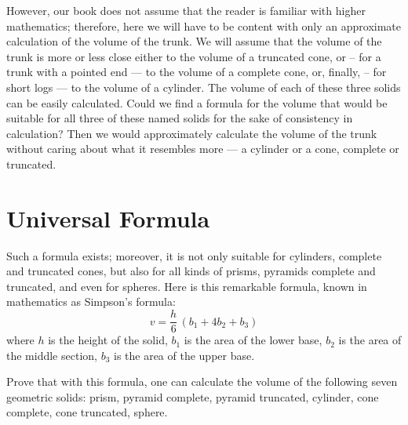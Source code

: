 However, our book does not assume that the reader is familiar with higher mathematics; therefore, here we will have to be content with only an approximate calculation of the volume of the trunk. We will assume that the volume of the trunk is more or less close either to the volume of a truncated cone, or -- for a trunk with a pointed end — to the volume of a complete cone, or, finally, -- for short logs — to the volume of a cylinder. The volume of each of these three solids can be easily calculated. Could we find a formula for the volume that would be suitable for all three of these named solids for the sake of consistency in calculation? Then we would approximately calculate the volume of the trunk without caring about what it resembles more — a cylinder or a cone, complete or truncated.


\section{Universal Formula}
\label{sec-1.11}

Such a formula exists; moreover, it is not only suitable for cylinders, complete and truncated cones, but also for all kinds of prisms, pyramids complete and truncated, and even for spheres. Here is this remarkable formula, known in mathematics as Simpson's formula:
\begin{equation*}
v = \frac{h}{6}\, (b_{1} + 4b_{2} + b_{3})
\end{equation*}
where $h$ is the height of the solid, $b_{1}$ is the area of the lower base, $b_{2}$ is the area of the middle section, $b_{3}$ is the area of the upper base.

\ques Prove that with this formula, one can calculate the volume of the following seven geometric solids: prism, pyramid complete, pyramid truncated, cylinder, cone complete, cone truncated, sphere.

